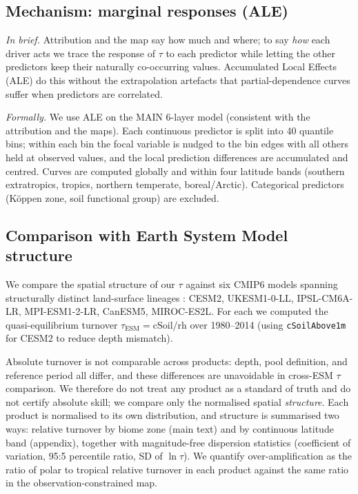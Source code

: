\subsection{Mechanism: marginal responses (ALE)}
\label{sec:ale}
\textit{In brief.} Attribution and the map say how much and where; to say \emph{how}
each driver acts we trace the response of $\tau$ to each predictor while letting the
other predictors keep their naturally co-occurring values. Accumulated Local
Effects (ALE) do this without the extrapolation artefacts that partial-dependence
curves suffer when predictors are correlated.

\textit{Formally.} We use ALE \citep{Apley2020} on the MAIN 6-layer model
(consistent with the attribution and the maps). Each continuous predictor is split
into 40 quantile bins; within each bin the focal variable is nudged to the bin
edges with all others held at observed values, and the local prediction differences
are accumulated and centred. Curves are computed globally and within four latitude
bands (southern extratropics, tropics, northern temperate, boreal/Arctic).
Categorical predictors (K\"oppen zone, soil functional group) are excluded.

\subsection{Comparison with Earth System Model structure}
\label{sec:esm}
We compare the spatial structure of our $\tau$ against six CMIP6 models spanning
structurally distinct land-surface lineages \citep{Varney2022}: CESM2, UKESM1-0-LL,
IPSL-CM6A-LR, MPI-ESM1-2-LR, CanESM5, MIROC-ES2L. For each we computed the
quasi-equilibrium turnover $\tau_\text{ESM}=\text{cSoil}/\text{rh}$
\citep{Koven2017,Carvalhais2014} over 1980--2014 (using \texttt{cSoilAbove1m} for
CESM2 to reduce depth mismatch).

Absolute turnover is not comparable across products: depth, pool definition, and
reference period all differ, and these differences are unavoidable in cross-ESM
$\tau$ comparison. We therefore do not treat any product as a standard of truth and
do not certify absolute skill; we compare only the normalised spatial
\emph{structure}. Each product is normalised to its own distribution, and structure
is summarised two ways: relative turnover by biome zone (main text) and by
continuous latitude band (appendix), together with magnitude-free dispersion
statistics (coefficient of variation, 95:5 percentile ratio, SD of $\ln\tau$). We
quantify over-amplification as the ratio of polar to tropical relative turnover in
each product against the same ratio in the observation-constrained map.

